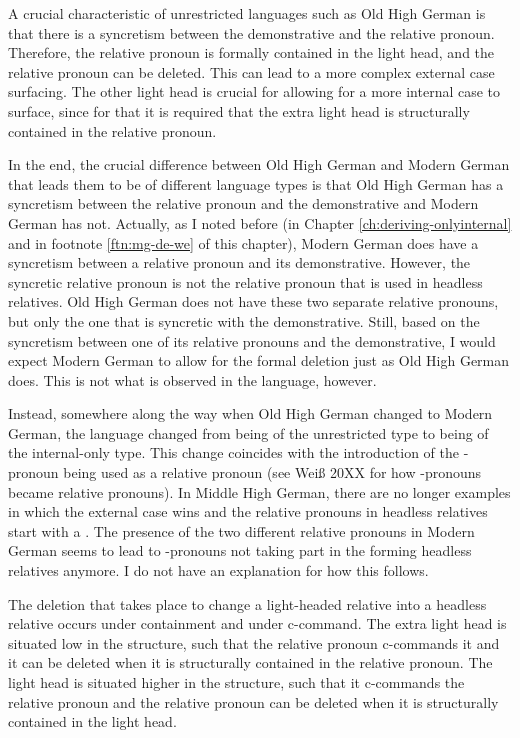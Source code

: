 A crucial characteristic of unrestricted languages such as Old High German is that there is a syncretism between the demonstrative and the relative pronoun. Therefore, the relative pronoun is formally contained in the light head, and the relative pronoun can be deleted. This can lead to a more complex external case surfacing. The other light head is crucial for allowing for a more internal case to surface, since for that it is required that the extra light head is structurally contained in the relative pronoun.

In the end, the crucial difference between Old High German and Modern German that leads them to be of different language types is that Old High German has a syncretism between the relative pronoun and the demonstrative and Modern German has not. Actually, as I noted before (in Chapter \ref{ch:deriving-onlyinternal} and in footnote \ref{ftn:mg-de-we} of this chapter), Modern German does have a syncretism between a relative pronoun and its demonstrative. However, the syncretic relative pronoun is not the relative pronoun that is used in headless relatives. Old High German does not have these two separate relative pronouns, but only the one that is syncretic with the demonstrative. Still, based on the syncretism between one of its relative pronouns and the demonstrative, I would expect Modern German to allow for the formal deletion just as Old High German does. This is not what is observed in the language, however.

Instead, somewhere along the way when Old High German changed to Modern German, the language changed from being of the unrestricted type to being of the internal-only type. This change coincides with the introduction of the -pronoun being used as a relative pronoun (see Weiß 20XX for how -pronouns became relative pronouns). In Middle High German, there are no longer examples in which the external case wins and the relative pronouns in headless relatives start with a  \citep{behaghel1923}. The presence of the two different relative pronouns in Modern German seems to lead to -pronouns not taking part in the forming headless relatives anymore. I do not have an explanation for how this follows.

The deletion that takes place to change a light-headed relative into a headless relative occurs under containment and under c-command. The extra light head is situated low in the structure, such that the relative pronoun c-commands it and it can be deleted when it is structurally contained in the relative pronoun. The light head is situated higher in the structure, such that it c-commands the relative pronoun and the relative pronoun can be deleted when it is structurally contained in the light head.


